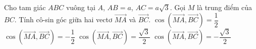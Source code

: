 \begin{ex}%
	Cho tam giác $ABC$ vuông tại $A$, $AB=a$, $AC=a\sqrt{3} $. Gọi $M$ là trung điểm của $BC$. Tính cô-sin góc giữa hai vectơ $\overrightarrow {MA}$ và $\overrightarrow {BC}$.
	\choice
	{$\cos \left(\overrightarrow {MA},\overrightarrow {BC}\right)=\dfrac {1}{2}$}
	{\True $\cos \left(\overrightarrow {MA},\overrightarrow {BC}\right)=-\dfrac {1}{2}$}
	{$\cos \left(\overrightarrow {MA},\overrightarrow {BC}\right)=\dfrac {\sqrt{3}}{2}$}
	{$\cos \left(\overrightarrow {MA},\overrightarrow {BC}\right)=-\dfrac {\sqrt{3}}{2}$}
\end{ex}
